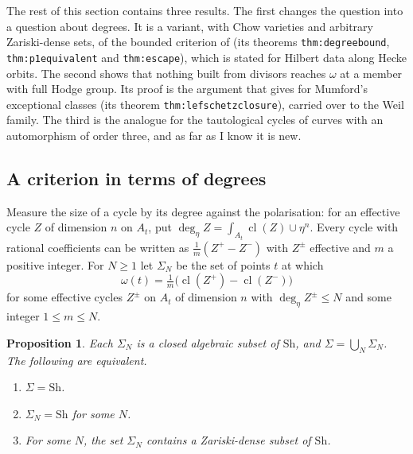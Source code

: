 \documentclass[11pt]{amsart}
\newtheorem{proposition}[theorem]{Proposition}
\theoremstyle{definition}
\theoremstyle{remark}
\newcommand{\Sh}{\mathrm{Sh}}
\newcommand{\cl}{\operatorname{cl}}
\begin{document}
The rest of this section contains three results. The first changes the
question into a question about degrees. It is a variant, with Chow
varieties and arbitrary Zariski-dense sets, of the bounded criterion of
\cite{BhH8} (its theorems \texttt{thm:degreebound}, \texttt{thm:p1equivalent}
and \texttt{thm:escape}), which is stated for Hilbert data along Hecke
orbits. The second shows that nothing built from divisors reaches
$\omega$ at a member with full Hodge group. Its proof is the argument that
\cite{BhH8} gives for Mumford's exceptional classes (its theorem
\texttt{thm:lefschetzclosure}), carried over to the Weil family. The third
is the analogue for the tautological cycles of curves with an automorphism
of order three, and as far as I know it is new.

\subsection{A criterion in terms of degrees}

Measure the size of a cycle by its degree against the polarisation: for an
effective cycle $Z$ of dimension $n$ on $A_{t}$, put
$\deg_{\eta}Z=\int_{A_{t}}\cl(Z)\cup\eta^{n}$. Every cycle with rational
coefficients can be written as $\frac1m(Z^{+}-Z^{-})$ with $Z^{\pm}$
effective and $m$ a positive integer. For $N\ge1$ let $\Sigma_{N}$ be the
set of points $t$ at which
\[
  \omega(t)=\tfrac1m\bigl(\cl(Z^{+})-\cl(Z^{-})\bigr)
\]
for some effective cycles $Z^{\pm}$ on $A_{t}$ of dimension $n$ with
$\deg_{\eta}Z^{\pm}\le N$ and some integer $1\le m\le N$.

\begin{proposition}\label{prop:bounded}
Each $\Sigma_{N}$ is a closed algebraic subset of $\Sh$, and
$\Sigma=\bigcup_{N}\Sigma_{N}$. The following are equivalent.
\begin{enumerate}[label=(\roman*)]
\item $\Sigma=\Sh$.
\item $\Sigma_{N}=\Sh$ for some $N$.
\item For some $N$, the set $\Sigma_{N}$ contains a Zariski-dense subset
of $\Sh$.
\end{enumerate}
\end{proposition}
\end{document}
